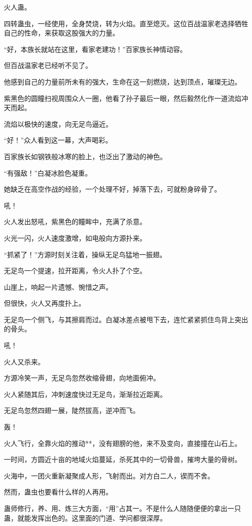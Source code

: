 \begin{this_body}
火人蛊。

四转蛊虫，一经使用，全身焚烧，转为火焰。直至熄灭。这位百战温家老选择牺牲自己的性命，来获取这股强大的力量。

“好，本族长就站在这里，看家老建功！”百家族长神情动容。

但百战温家老已经听不见了。

他感到自己的力量前所未有的强大，生命在这一刻燃烧，达到顶点，璀璨无边。

紫黑色的圆瞳扫视周围众人一圈，他看了孙子最后一眼，然后毅然化作一道流焰冲天而起。

流焰以极快的速度，向无足鸟逼近。

“好！”众人看到这一幕，大声喝彩。

百家族长如钢铁般冰寒的脸上，也泛出了激动的神色。

“有强敌！”白凝冰脸色凝重。

她缺乏在高空作战的经验，一个处理不好，掉落下去，可就粉身碎骨了。

吼！

火人发出怒吼，紫黑色的瞳眸中，充满了杀意。

火光一闪，火人速度激增，如电般向方源扑来。

“抓紧了！”方源时刻关注着，操纵无足鸟猛地一振翅。

无足鸟一个提速，拉开距离，令火人扑了个空。

山崖上，响起一片遗憾、惋惜之声。

但很快，火人又再度扑上。

无足鸟一个侧飞，与其擦肩而过。白凝冰差点被甩下去，连忙紧紧抓住鸟背上突出的骨头。

吼！

火人又杀来。

方源冷笑一声，无足鸟忽然收缩骨翅，向地面俯冲。

火人紧随其后，冲刺速度快过无足鸟，渐渐拉近距离。

无足鸟忽然四翅一展，陡然拔高，逆冲而飞。

轰！

火人飞行，全靠火焰的推动**，没有翅膀的他，来不及变向，直接撞在山石上。

一时间，方圆近十亩的地域火焰蔓延，杀死其中的一切骨兽，摧垮大量的骨树。

火海中，一团火重新凝聚成人形，飞射而出。对方白二人，锲而不舍。

然而，蛊虫也要看什么样的人再用。

蛊师修行，养、用、炼三大方面，“用”占其一。不是什么人随随便便的拿出一只蛊，就能发挥出色的。这里面的门道、学问都很深厚。


\end{this_body}
